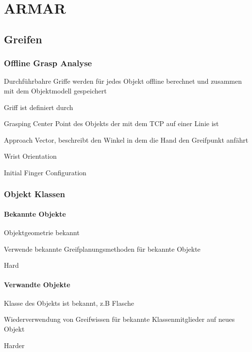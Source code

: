 \chapter{ARMAR}

 \section{Greifen}
 \subsection{Offline Grasp Analyse}
 \begin{compactitem}
     \item Durchführbahre Griffe werden für jedes Objekt offline berechnet und
     zusammen mit dem Objektmodell gespeichert
     \item Griff ist definiert durch
     \begin{compactitem}
         \item Grasping Center Point des Objekts der mit dem TCP auf einer Linie
         ist
         \item Approach Vector, beschreibt den Winkel in dem die Hand den Greifpunkt
         anfährt
         \item Wrist Orientation
         \item Initial Finger Configuration
     \end{compactitem}
 \end{compactitem}

 \subsection{Objekt Klassen}
 \subsubsection{Bekannte Objekte}
 \begin{compactitem}
     \item Objektgeometrie bekannt
     \item Verwende bekannte Greifplanungsmethoden für bekannte Objekte
     \item Hard
 \end{compactitem}
 \subsubsection{Verwandte Objekte}
 \begin{compactitem}
     \item Klasse des Objekts ist bekannt, z.B Flasche
     \item Wiederverwendung von Greifwissen für bekannte Klassenmitglieder auf
     neues Objekt
     \item Harder
 \end{compactitem}
